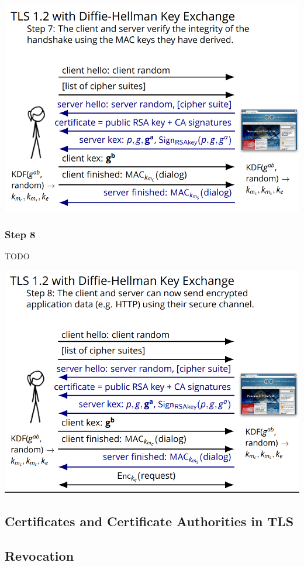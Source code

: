 \documentclass[11pt]{article} %
\begin{document}
{\includegraphics[scale=1.2]{./DiffieStep7.png}

\newpage
\subsubsection{Step 8}
TODO

\includegraphics[scale=1.2]{./DiffieStep8.png}

\newpage
\subsection{Certificates and Certificate Authorities in TLS}

\subsection{Revocation}

}
\end{document}
